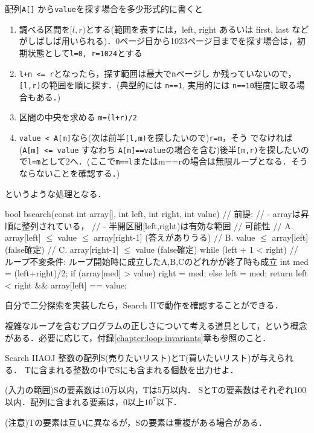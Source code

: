 配列\texttt{A[]} から\texttt{value}を探す場合を多少形式的に書くと
\begin{enumerate}
\setlength{\itemsep}{0pt}
\item 調べる区間を$[l,r)$とする(範囲を表すには，left, right あるいは
  first, last などがしばしば用いられる)．0ページ目から1023ページ目までを探す場合は，初期状態として\texttt{l=0, r=1024}とする
\item \texttt{l+n <= r}となったら，探す範囲は最大で\texttt{n}ページし
  か残っていないので，\texttt{[l,r)}の範囲を順に探す．(典型的には
    \texttt{n==1}, 実用的には \texttt{n==10}程度に取る場合もある．)
\item 区間の中央を求める \texttt{m=(l+r)/2}
\item \texttt{value < A[m]}なら(次は前半\texttt{[l,m)}を探したいので)\texttt{r=m}，そう
  でなければ(\texttt{A[m] <= value} すなわち \texttt{A[m]==value}の場合を含む)後半\texttt{[m,r)}を探したいので\texttt{l=m}として2へ．(ここで\texttt{m==l}または{m==r}の場合は無限ループとなる．そうならないことを確認する．)
\end{enumerate}
というような処理となる．

\begin{cbox}[emph={left,right}]
bool bsearch(const int array[], int left, int right, int value) {
    // 前提:
    // - arrayは昇順に整列されている，
    // - 半開区間[left,right)は有効な範囲
    // 可能性
    // A. array[left] \(\le\) value \(\le\) array[right-1] (答えがありうる)
    // B. value \(\le\) array[left] (false確定)
    // C. array[right-1] \(\le\) value  (false確定)
    while (left + 1 < right) {
        // ループ不変条件: ループ開始時に成立したA,B,Cのどれかが終了時も成立
        int med = (left+right)/2;
        if (array[med] > value) right = med;
        else left = med;
    }
    return left < right && array[left] == value;
}
\end{cbox}

自分で二分探索を実装したら，Search IIで動作を確認することができる．

複雑なループを含むプログラムの正しさについて考える道具として，という概念がある．必要に応じて，付録\ref{chapter:loop-invariants}章も参照のこと．

\begin{psbox}{Search II}{AOJ}
整数の配列S(売りたいリスト)とT(買いたいリスト)が与えられる．
Tに含まれる整数の中でSにも含まれる個数を出力せよ．

(入力の範囲)Sの要素数は10万以内，Tは5万以内．
SとTの要素数はそれぞれ100以内．配列に含まれる要素は，0以上$10^7$以下．

(注意)Tの要素は互いに異なるが，Sの要素は重複がある場合がある．


\end{psbox}

